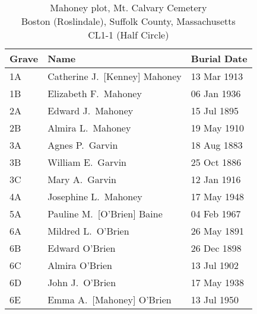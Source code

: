 \begin{table}[ht]
	\centering
	\caption{Mahoney plot, Mt. Calvary Cemetery\cite{John3OBrienBurial:3} \\
		Boston (Roslindale), Suffolk County, Massachusetts\\
		CL1-1 (Half Circle)}
	\begin{tabular}{|l|l|l|}
		\hline
		\textbf{Grave} & \textbf{Name} & \textbf{Burial Date} \\
		\hline
		1A & Catherine J.\ [Kenney] Mahoney\index{Kenney!Catherine Josephine}\index{Mahoney/Mahony!Catherine Josephine (Kenney)} & 13 Mar 1913 \\
		\hline
		1B & Elizabeth F.\ Mahoney\index{Mahoney/Mahony!Elizabeth F.} & 06 Jan 1936 \\
		\hline
		2A & Edward J.\ Mahoney\index{Mahoney/Mahony!Edward} & 15 Jul 1895 \\
		\hline
		2B & Almira L.\ Mahoney\index{Mahoney/Mahony!Almira L.} & 19 May 1910 \\
		\hline
		3A & Agnes P.\ Garvin\index{Garvin!Agnes P.} & 18 Aug 1883 \\
		\hline
		3B & William E.\ Garvin\index{Garvin!William E.} & 25 Oct 1886 \\
		\hline
		3C & Mary A.\ Garvin\index{Garvin!Mary A.} & 12 Jan 1916 \\
		\hline
		4A & Josephine L.\ Mahoney\index{Mahoney/Mahony!Josephine L.} & 17 May 1948 \\
		\hline
		5A & Pauline M.\ [O'Brien] Baine\index{O'Brien!Pauline M.\textsuperscript{4}}\index{Baine!Pauline M.\textsuperscript{4} (O'Brien)} & 04 Feb 1967 \\
		\hline
		6A & Mildred L.\ O'Brien\index{O'Brien!Mildred Loretta\textsuperscript{4}} & 26 May 1891 \\
		\hline
		6B & Edward O'Brien\index{O'Brien!Edward\textsuperscript{4} (1898--1898)} & 26 Dec 1898 \\
		\hline
		6C & Almira O'Brien\index{O'Brien!Almyra Louise\textsuperscript{4}} & 13 Jul 1902 \\
		\hline
		6D & John J.\ O'Brien\index{O'Brien!John Joseph\textsuperscript{3} (1861--1938)} & 17 May 1938 \\
		\hline
		6E & Emma A.\ [Mahoney] O'Brien\index{Mahoney/Mahony!Emma}\index{O'Brien!Emma (Mahony)} & 13 Jul 1950 \\
		\hline
	\end{tabular}
\end{table}

